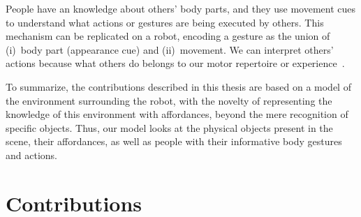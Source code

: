 People have an \apriori{} knowledge about others' body parts, and they use movement cues to understand what actions or gestures are being executed by others.
This mechanism can be replicated on a robot, encoding a gesture as the union of (i)~body part (appearance cue) and (ii)~movement.
We can interpret others' actions because what others do belongs to our motor repertoire or experience~\cite{rizzolatti:2001:nrn}.

\bigskip

To summarize, the contributions described in this thesis are based on a model of the environment surrounding the robot, with the novelty of representing the knowledge of this environment with affordances, beyond the mere recognition of specific objects.
Thus, our model looks at the physical objects present in the scene, their affordances, as well as people with their informative body gestures and actions.

\section{Contributions}
\label{sec:motivation:main_contributions}

